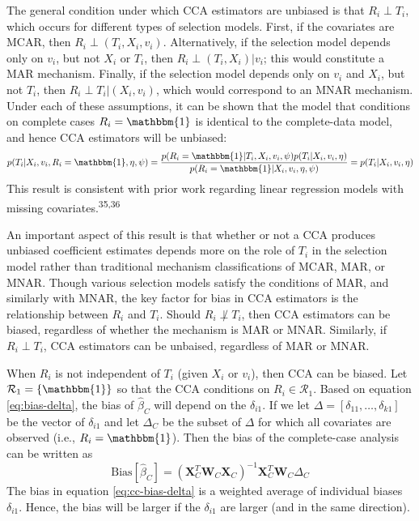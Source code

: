 \documentclass[
]{article}
\begin{document}
The general condition under which CCA estimators are unbiased is that \(R_i \perp T_i\), which occurs for different types of selection models.
First, if the covariates are MCAR, then \(R_i \perp (T_i, X_i, v_i)\).
Alternatively, if the selection model depends only on \(v_i\), but not \(X_i\) or \(T_i\), then \(R_i \perp (T_i, X_i) | v_i\); this would constitute a MAR mechanism.
Finally, if the selection model depends only on \(v_i\) and \(X_i\), but not \(T_i\), then \(R_i \perp T_i | (X_i, v_i)\), which would correspond to an MNAR mechanism.
Under each of these assumptions, it can be shown that the model that conditions on complete cases \(R_i = \mathbbm{1}\) is identical to the complete-data model, and hence CCA estimators will be unbiased:
\begin{equation}
p(T_i | X_i, v_i, R_i = \mathbbm{1}, \eta, \psi) 
  = \frac{p(R_i = \mathbbm{1} | T_i, X_i, v_i, \psi) p(T_i | X_i, v_i, \eta)}{p(R_i = \mathbbm{1} | X_i, v_i, \eta, \psi)}
  = p(T_i | X_i, v_i, \eta)
\label{eq:cc-unbiased}
\end{equation}
This result is consistent with prior work regarding linear regression models with missing covariates.\textsuperscript{35,36}

An important aspect of this result is that whether or not a CCA produces unbiased coefficient estimates depends more on the role of \(T_i\) in the selection model rather than traditional mechanism classifications of MCAR, MAR, or MNAR.
Though various selection models satisfy the conditions of MAR, and similarly with MNAR, the key factor for bias in CCA estimators is the relationship between \(R_i\) and \(T_i\).
Should \(R_i \not\perp T_i\), then CCA estimators can be biased, regardless of whether the mechanism is MAR or MNAR.
Similarly, if \(R_i \perp T_i\), CCA estimators can be unbaised, regardless of MAR or MNAR.

When \(R_i\) is not independent of \(T_i\) (given \(X_i\) or \(v_i\)), then CCA can be biased.
Let \(\mathcal{R}_1 = \{\mathbbm{1}\}\) so that the CCA conditions on \(R_i \in \mathcal{R}_1\).
Based on equation \eqref{eq:bias-delta}, the bias of \(\hat{\beta}_C\) will depend on the \(\delta_{i1}\).
If we let \(\Delta = [\delta_{11}, \ldots, \delta_{k1}]\) be the vector of \(\delta_{i1}\) and let \(\Delta_C\) be the subset of \(\Delta\) for which all covariates are observed (i.e., \(R_i = \mathbbm{1}\)).
Then the bias of the complete-case analysis can be written as
\begin{equation}
\text{Bias}[\hat{\beta}_C] = (\mathbf{X}_C^T \mathbf{W}_C \mathbf{X}_C)^{-1} \mathbf{X}_C^T \mathbf{W}_C \Delta_C
\label{eq:cc-bias-delta}
\end{equation}
The bias in equation \eqref{eq:cc-bias-delta} is a weighted average of individual biases \(\delta_{i1}\).
Hence, the bias will be larger if the \(\delta_{i1}\) are larger (and in the same direction).
\end{document}

